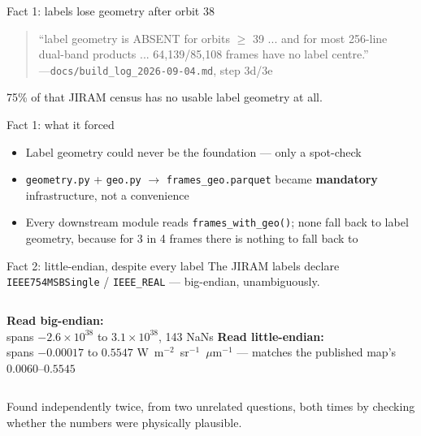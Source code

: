 \documentclass[aspectratio=169,11pt]{beamer}
\newcommand{\currevsec}{}
\newcommand{\revsec}[1]{\gdef\currevsec{#1}}
\begin{document}
\begin{frame}{Fact 1: labels lose geometry after orbit 38}
  \revsec{2.1}
  \begin{quote}\small
    ``label geometry is ABSENT for orbits $\geq$ 39 ... and for most 256-line dual-band products ... 64{,}139/85{,}108 frames have no label centre.'' \\
    \hfill---\texttt{docs/build\_log\_2026-09-04.md}, step 3d/3e
  \end{quote}
  75\% of that JIRAM census has no usable label geometry at all.
\end{frame}

\begin{frame}{Fact 1: what it forced}
  \revsec{2.1}
  \begin{itemize}
    \item Label geometry could never be the foundation --- only a spot-check
    \item \texttt{geometry.py} + \texttt{geo.py} $\to$ \texttt{frames\_geo.parquet} became \textbf{mandatory} infrastructure, not a convenience
    \item Every downstream module reads \texttt{frames\_with\_geo()}; none fall back to label geometry, because for 3 in 4 frames there is nothing to fall back to
  \end{itemize}
\end{frame}

\begin{frame}{Fact 2: little-endian, despite every label}
  \revsec{2.2}
  The JIRAM labels declare \texttt{IEEE754MSBSingle} / \texttt{IEEE\_REAL} --- big-endian, unambiguously.
  \vspace{0.2cm}
  \begin{columns}
    \textbf{Read big-endian:}\\
    \small spans $-2.6\times10^{38}$ to $3.1\times10^{38}$, 143 NaNs
    \textbf{Read little-endian:}\\
    \small spans $-0.00017$ to $0.5547$ W~m$^{-2}$~sr$^{-1}$~$\mu$m$^{-1}$ --- matches the published map's $0.0060$--$0.5545$
  \end{columns}
  \vspace{0.3cm}
  Found independently twice, from two unrelated questions, both times by checking whether the numbers were physically plausible.
\end{frame}
\end{document}
